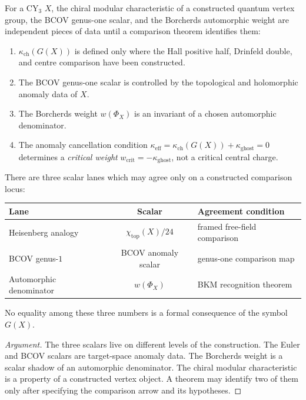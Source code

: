 \begin{theorem}
\label{thm:phys-anom-non-cancellation}
For a CY$_3$ $X$, the chiral modular characteristic of a constructed quantum vertex group, the BCOV genus-one scalar, and the Borcherds automorphic weight are independent pieces of data until a comparison theorem identifies them:
\begin{enumerate}[label=\textup{(\roman*)}]
 \item $\kappa_{\mathrm{ch}}(G(X))$ is defined only where the Hall positive half, Drinfeld double, and centre comparison have been constructed.
 \item The BCOV genus-one scalar is controlled by the topological and holomorphic anomaly data of $X$.
 \item The Borcherds weight $w(\Phi_X)$ is an invariant of a chosen automorphic denominator.
 \item The anomaly cancellation condition $\kappa_{\mathrm{eff}} = \kappa_{\mathrm{ch}}(G(X)) + \kappa_{\mathrm{ghost}} = 0$ determines a \emph{critical weight} $w_{\mathrm{crit}} = -\kappa_{\mathrm{ghost}}$, not a critical central charge.
\end{enumerate}
There are three scalar lanes which may agree only on a constructed comparison locus:
\begin{center}
\begin{tabular}{lcl}
\textbf{Lane} & \textbf{Scalar} & \textbf{Agreement condition} \\ \hline
Heisenberg analogy & $\chi_{\mathrm{top}}(X)/24$ & framed free-field comparison \\
BCOV genus-$1$ & BCOV anomaly scalar & genus-one comparison map \\
Automorphic denominator & $w(\Phi_X)$ & BKM recognition theorem
\end{tabular}
\end{center}
No equality among these three numbers is a formal consequence of the symbol \(G(X)\).
\end{theorem}

\begin{proof}[Argument]
The three scalars live on different levels of the construction. The Euler and BCOV scalars are target-space anomaly data. The Borcherds weight is a scalar shadow of an automorphic denominator. The chiral modular characteristic is a property of a constructed vertex object. A theorem may identify two of them only after specifying the comparison arrow and its hypotheses.
\end{proof}

